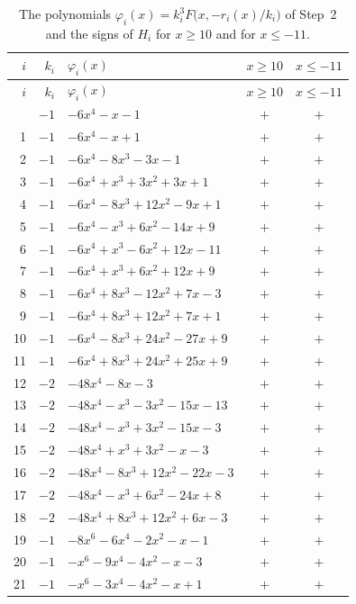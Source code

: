\documentclass[11pt]{article}
\begin{document}
\begingroup\footnotesize
\setlength{\LTcapwidth}{\textwidth}
\begin{longtable}{@{}rrlcc@{}}
\caption{The polynomials $\varphi_i(x)=k_i^3F\bigl(x,-r_i(x)/k_i\bigr)$ of Step~2 and the signs of $H_i$ for $x\geq10$ and for $x\leq-11$.}\label{tab:phi}\\
\hline $i$ & $k_i$ & $\varphi_i(x)$ & $x\geq10$ & $x\leq-11$\\\hline\endfirsthead\hline $i$ & $k_i$ & $\varphi_i(x)$ & $x\geq10$ & $x\leq-11$\\\hline\endhead\hline\endfoot
0 & $-1$ & $-6x^{4}-x-1$ & $+$ & $+$\\
1 & $-1$ & $-6x^{4}-x+1$ & $+$ & $+$\\
2 & $-1$ & $-6x^{4}-8x^{3}-3x-1$ & $+$ & $+$\\
3 & $-1$ & $-6x^{4}+x^{3}+3x^{2}+3x+1$ & $+$ & $+$\\
4 & $-1$ & $-6x^{4}-8x^{3}+12x^{2}-9x+1$ & $+$ & $+$\\
5 & $-1$ & $-6x^{4}-x^{3}+6x^{2}-14x+9$ & $+$ & $+$\\
6 & $-1$ & $-6x^{4}+x^{3}-6x^{2}+12x-11$ & $+$ & $+$\\
7 & $-1$ & $-6x^{4}+x^{3}+6x^{2}+12x+9$ & $+$ & $+$\\
8 & $-1$ & $-6x^{4}+8x^{3}-12x^{2}+7x-3$ & $+$ & $+$\\
9 & $-1$ & $-6x^{4}+8x^{3}+12x^{2}+7x+1$ & $+$ & $+$\\
10 & $-1$ & $-6x^{4}-8x^{3}+24x^{2}-27x+9$ & $+$ & $+$\\
11 & $-1$ & $-6x^{4}+8x^{3}+24x^{2}+25x+9$ & $+$ & $+$\\
12 & $-2$ & $-48x^{4}-8x-3$ & $+$ & $+$\\
13 & $-2$ & $-48x^{4}-x^{3}-3x^{2}-15x-13$ & $+$ & $+$\\
14 & $-2$ & $-48x^{4}-x^{3}+3x^{2}-15x-3$ & $+$ & $+$\\
15 & $-2$ & $-48x^{4}+x^{3}+3x^{2}-x-3$ & $+$ & $+$\\
16 & $-2$ & $-48x^{4}-8x^{3}+12x^{2}-22x-3$ & $+$ & $+$\\
17 & $-2$ & $-48x^{4}-x^{3}+6x^{2}-24x+8$ & $+$ & $+$\\
18 & $-2$ & $-48x^{4}+8x^{3}+12x^{2}+6x-3$ & $+$ & $+$\\
19 & $-1$ & $-8x^{6}-6x^{4}-2x^{2}-x-1$ & $+$ & $+$\\
20 & $-1$ & $-x^{6}-9x^{4}-4x^{2}-x-3$ & $+$ & $+$\\
21 & $-1$ & $-x^{6}-3x^{4}-4x^{2}-x+1$ & $+$ & $+$\\

\end{longtable}
\end{document}
